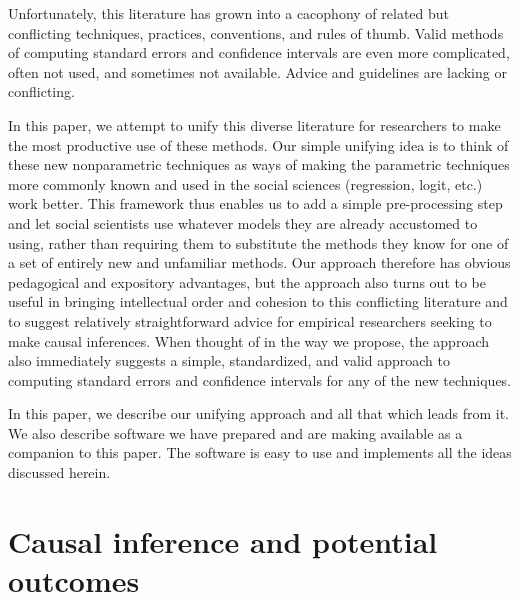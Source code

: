 \documentclass[11pt,titlepage]{article}
\begin{document}
Unfortunately, this literature has grown into a cacophony of related
but conflicting techniques, practices, conventions, and rules of
thumb.  Valid methods of computing standard errors and confidence
intervals are even more complicated, often not used, and sometimes not
available.  Advice and guidelines are lacking or conflicting.
                                                                                                                                                             
In this paper, we attempt to unify this diverse literature for
researchers to make the most productive use of these methods.  Our
simple unifying idea is to think of these new nonparametric techniques
as ways of making the parametric techniques more commonly known and
used in the social sciences (regression, logit, etc.) work better.
This framework thus enables us to add a simple pre-processing step and
let social scientists use whatever models they are already accustomed
to using, rather than requiring them to substitute the methods they
know for one of a set of entirely new and unfamiliar methods.  Our
approach therefore has obvious pedagogical and expository advantages,
but the approach also turns out to be useful in bringing intellectual
order and cohesion to this conflicting literature and to suggest
relatively straightforward advice for empirical researchers seeking to
make causal inferences.  When thought of in the way we propose, the
approach also immediately suggests a simple, standardized, and valid
approach to computing standard errors and confidence intervals for any
of the new techniques.
                                                                                                                                                             
In this paper, we describe our unifying approach and all that which
leads from it.  We also describe software we have prepared and are
making available as a companion to this paper.  The software is easy
to use and implements all the ideas discussed herein.
                                                                                                                                                             
\section{Causal inference and potential outcomes}
\end{document}
